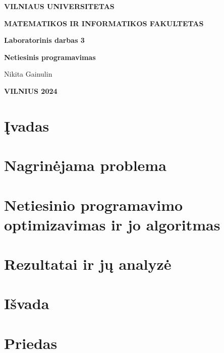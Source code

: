 \documentclass{article}
\begin{document}
\newlength{\mywidth}
\settowidth{\mywidth}{Darbo vadovas:}
\begin{titlepage}
    \vskip 20pt
    \centerline{\bf \large VILNIAUS UNIVERSITETAS}
    \bigskip
    \centerline{\large \textbf{MATEMATIKOS IR INFORMATIKOS FAKULTETAS}}
    \vskip 120pt
    \centerline{\bf \Large \textbf{Laboratorinis darbas 3}}
    \vskip 50pt
    \begin{center}
        {\bf \LARGE Netiesinis programavimas}
    \end{center}
    \bigskip
    \bigskip
    \centerline{\Large Nikita Gainulin}
    \vskip 90pt
    \vskip 200pt
    \centerline{\large \textbf{VILNIUS 2024}}
\end{titlepage}

\tableofcontents
\clearpage

\section{Įvadas}
\section{Nagrinėjama problema}
\section{Netiesinio programavimo optimizavimas ir jo algoritmas}
\section{Rezultatai ir jų analyzė}
\section{Išvada}
\section{Priedas}
\end{document}
